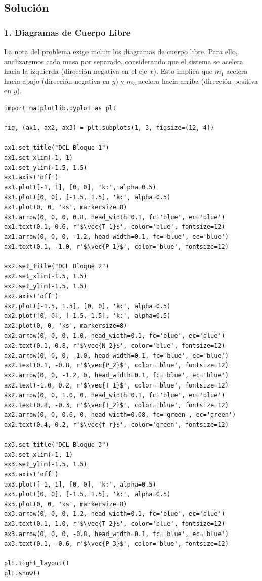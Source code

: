 \documentclass[12pt, a4paper]{article}
\begin{document}
\subsection*{Solución}

\subsubsection*{1. Diagramas de Cuerpo Libre}
La nota del problema exige incluir los diagramas de cuerpo libre. Para ello, analizaremos cada masa por separado, considerando que el sistema se acelera hacia la izquierda (dirección negativa en el eje $x$). Esto implica que $m_1$ acelera hacia abajo (dirección negativa en $y$) y $m_3$ acelera hacia arriba (dirección positiva en $y$).

\begin{lstlisting}
import matplotlib.pyplot as plt

fig, (ax1, ax2, ax3) = plt.subplots(1, 3, figsize=(12, 4))

ax1.set_title("DCL Bloque 1")
ax1.set_xlim(-1, 1)
ax1.set_ylim(-1.5, 1.5)
ax1.axis('off')
ax1.plot([-1, 1], [0, 0], 'k:', alpha=0.5)
ax1.plot([0, 0], [-1.5, 1.5], 'k:', alpha=0.5)
ax1.plot(0, 0, 'ks', markersize=8)
ax1.arrow(0, 0, 0, 0.8, head_width=0.1, fc='blue', ec='blue')
ax1.text(0.1, 0.6, r'$\vec{T_1}$', color='blue', fontsize=12)
ax1.arrow(0, 0, 0, -1.2, head_width=0.1, fc='blue', ec='blue')
ax1.text(0.1, -1.0, r'$\vec{P_1}$', color='blue', fontsize=12)

ax2.set_title("DCL Bloque 2")
ax2.set_xlim(-1.5, 1.5)
ax2.set_ylim(-1.5, 1.5)
ax2.axis('off')
ax2.plot([-1.5, 1.5], [0, 0], 'k:', alpha=0.5)
ax2.plot([0, 0], [-1.5, 1.5], 'k:', alpha=0.5)
ax2.plot(0, 0, 'ks', markersize=8)
ax2.arrow(0, 0, 0, 1.0, head_width=0.1, fc='blue', ec='blue')
ax2.text(0.1, 0.8, r'$\vec{N_2}$', color='blue', fontsize=12)
ax2.arrow(0, 0, 0, -1.0, head_width=0.1, fc='blue', ec='blue')
ax2.text(0.1, -0.8, r'$\vec{P_2}$', color='blue', fontsize=12)
ax2.arrow(0, 0, -1.2, 0, head_width=0.1, fc='blue', ec='blue')
ax2.text(-1.0, 0.2, r'$\vec{T_1}$', color='blue', fontsize=12)
ax2.arrow(0, 0, 1.0, 0, head_width=0.1, fc='blue', ec='blue')
ax2.text(0.8, -0.3, r'$\vec{T_2}$', color='blue', fontsize=12)
ax2.arrow(0, 0, 0.6, 0, head_width=0.08, fc='green', ec='green')
ax2.text(0.4, 0.2, r'$\vec{f_r}$', color='green', fontsize=12)

ax3.set_title("DCL Bloque 3")
ax3.set_xlim(-1, 1)
ax3.set_ylim(-1.5, 1.5)
ax3.axis('off')
ax3.plot([-1, 1], [0, 0], 'k:', alpha=0.5)
ax3.plot([0, 0], [-1.5, 1.5], 'k:', alpha=0.5)
ax3.plot(0, 0, 'ks', markersize=8)
ax3.arrow(0, 0, 0, 1.2, head_width=0.1, fc='blue', ec='blue')
ax3.text(0.1, 1.0, r'$\vec{T_2}$', color='blue', fontsize=12)
ax3.arrow(0, 0, 0, -0.8, head_width=0.1, fc='blue', ec='blue')
ax3.text(0.1, -0.6, r'$\vec{P_3}$', color='blue', fontsize=12)

plt.tight_layout()
plt.show()
\end{lstlisting}
\end{document}

